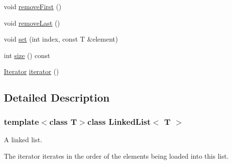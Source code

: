 \begin{DoxyCompactItemize}
\item 
void \hyperlink{class_linked_list_a76217192e645bda6cf1ff08c297c9e2f}{remove\-First} ()
\item 
void \hyperlink{class_linked_list_a5d4da569432cad347d60d19a46098672}{remove\-Last} ()
\item 
void \hyperlink{class_linked_list_afc6e6855d4f7c7babceb3e67ad01dd14}{set} (int index, const T \&element)
\item 
int \hyperlink{class_linked_list_a1d41dc6acb9222b8dcef37485fbbf0dd}{size} () const 
\item 
\hyperlink{class_linked_list_1_1_iterator}{Iterator} \hyperlink{class_linked_list_a6304437e7c2bf371965a2e722ecee408}{iterator} ()
\end{DoxyCompactItemize}


\subsection{Detailed Description}
\subsubsection*{template$<$class T$>$class Linked\-List$<$ T $>$}

A linked list.

The iterator iterates in the order of the elements being loaded into this list. 

